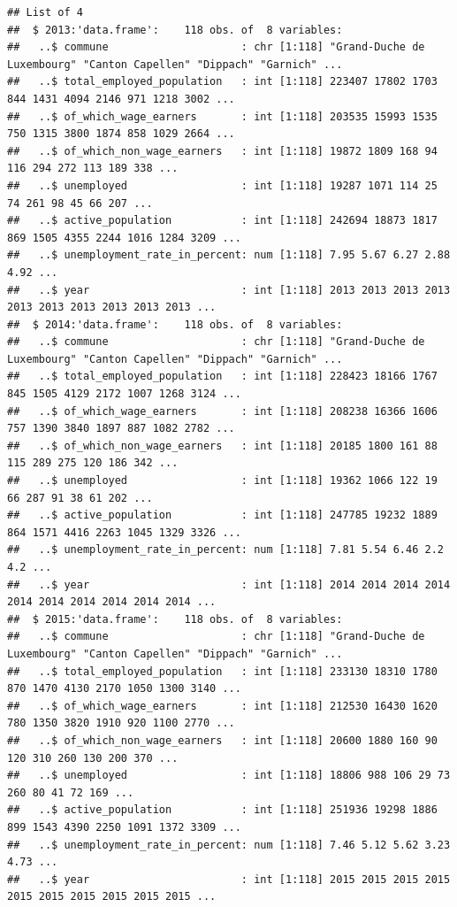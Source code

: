 \documentclass[]{gitbook}
\theoremstyle{definition}
\theoremstyle{definition}
\theoremstyle{definition}
\theoremstyle{remark}
\begin{document}
\begin{verbatim}
## List of 4
##  $ 2013:'data.frame':    118 obs. of  8 variables:
##   ..$ commune                     : chr [1:118] "Grand-Duche de Luxembourg" "Canton Capellen" "Dippach" "Garnich" ...
##   ..$ total_employed_population   : int [1:118] 223407 17802 1703 844 1431 4094 2146 971 1218 3002 ...
##   ..$ of_which_wage_earners       : int [1:118] 203535 15993 1535 750 1315 3800 1874 858 1029 2664 ...
##   ..$ of_which_non_wage_earners   : int [1:118] 19872 1809 168 94 116 294 272 113 189 338 ...
##   ..$ unemployed                  : int [1:118] 19287 1071 114 25 74 261 98 45 66 207 ...
##   ..$ active_population           : int [1:118] 242694 18873 1817 869 1505 4355 2244 1016 1284 3209 ...
##   ..$ unemployment_rate_in_percent: num [1:118] 7.95 5.67 6.27 2.88 4.92 ...
##   ..$ year                        : int [1:118] 2013 2013 2013 2013 2013 2013 2013 2013 2013 2013 ...
##  $ 2014:'data.frame':    118 obs. of  8 variables:
##   ..$ commune                     : chr [1:118] "Grand-Duche de Luxembourg" "Canton Capellen" "Dippach" "Garnich" ...
##   ..$ total_employed_population   : int [1:118] 228423 18166 1767 845 1505 4129 2172 1007 1268 3124 ...
##   ..$ of_which_wage_earners       : int [1:118] 208238 16366 1606 757 1390 3840 1897 887 1082 2782 ...
##   ..$ of_which_non_wage_earners   : int [1:118] 20185 1800 161 88 115 289 275 120 186 342 ...
##   ..$ unemployed                  : int [1:118] 19362 1066 122 19 66 287 91 38 61 202 ...
##   ..$ active_population           : int [1:118] 247785 19232 1889 864 1571 4416 2263 1045 1329 3326 ...
##   ..$ unemployment_rate_in_percent: num [1:118] 7.81 5.54 6.46 2.2 4.2 ...
##   ..$ year                        : int [1:118] 2014 2014 2014 2014 2014 2014 2014 2014 2014 2014 ...
##  $ 2015:'data.frame':    118 obs. of  8 variables:
##   ..$ commune                     : chr [1:118] "Grand-Duche de Luxembourg" "Canton Capellen" "Dippach" "Garnich" ...
##   ..$ total_employed_population   : int [1:118] 233130 18310 1780 870 1470 4130 2170 1050 1300 3140 ...
##   ..$ of_which_wage_earners       : int [1:118] 212530 16430 1620 780 1350 3820 1910 920 1100 2770 ...
##   ..$ of_which_non_wage_earners   : int [1:118] 20600 1880 160 90 120 310 260 130 200 370 ...
##   ..$ unemployed                  : int [1:118] 18806 988 106 29 73 260 80 41 72 169 ...
##   ..$ active_population           : int [1:118] 251936 19298 1886 899 1543 4390 2250 1091 1372 3309 ...
##   ..$ unemployment_rate_in_percent: num [1:118] 7.46 5.12 5.62 3.23 4.73 ...
##   ..$ year                        : int [1:118] 2015 2015 2015 2015 2015 2015 2015 2015 2015 2015 ...

\end{verbatim}
\end{document}

